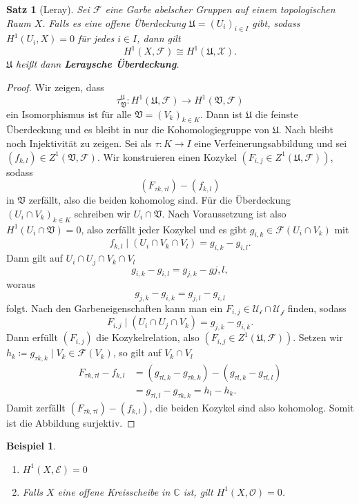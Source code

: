 \documentclass[11pt,a4paper,toc=bibliography]{scrartcl}
\theoremstyle{thm}
\newtheorem{satz}{Satz}[section]
\theoremstyle{def}
\newtheorem{bsp}{Beispiel}[section]
\theoremstyle{remark}
\begin{document}
\begin{satz}[Leray]
Sei $\mathcal{F}$ eine Garbe abelscher Gruppen auf einem topologischen Raum $X$. Falls es eine offene Überdeckung $\mathfrak{U}=(U_i)_{i\in I}$ gibt, sodass $H^1(U_i,X)=0$ für jedes $i\in I$, dann gilt
\[
H^1(X,\mathcal{F})\cong H^1(\mathfrak{U},\mathcal{X}).
\]
$\mathfrak{U}$ heißt dann \textbf{Leraysche Überdeckung}.
\end{satz}
\begin{proof}
	Wir zeigen, dass
	\[\tau_{\mathfrak{V}}^{\mathfrak{U}}:H^1(\mathfrak{U},\mathcal{F})\rightarrow H^1(\mathfrak{V},\mathcal{F})\]
	ein Isomorphismus ist für alle $\mathfrak{V}=(V_k)_{k\in K}$. Dann ist $\mathfrak{U}$ die feinste Überdeckung und es bleibt in  nur die Kohomologiegruppe von $\mathfrak{U}$. Nach  bleibt noch Injektivität zu zeigen.
	Sei als $\tau : K\rightarrow I$ eine Verfeinerungsabbildung und sei $(f_{k,l})\in Z^1(\mathfrak{V},\mathcal{F}).$ Wir konstruieren einen Kozykel $(F_{i,j}\in Z^1(\mathfrak{U},\mathcal{F}))$, sodass \[(F_{\tau k,\tau l})-(f_{k,l})\]
	in $\mathfrak{V}$ zerfällt, also die beiden kohomolog sind.
	Für die Überdeckung $(U_i\cap V_k)_{k\in K}$ schreiben wir $U_i\cap\mathfrak{V}$. Nach Voraussetzung ist also $H^1(U_i\cap \mathfrak{V})=0$, also zerfällt jeder Kozykel und es gibt $g_{i,k}\in\mathcal{F}(U_i\cap V_k)$ mit
	\[f_{k,l}\mid (U_i\cap V_k\cap V_l)=g_{i,k}-g_{i,l}.
	\]
	Dann gilt auf $U_i\cap U_j\cap V_k\cap V_l$
	\[g_{i,k}-g_{i,l}=g_{j,k}-g{j,l},
	\]
	woraus
	\[g_{j,k}-g_{i,k}=g_{j,l}-g_{i,l}
	\]
	folgt. Nach den Garbeneigenschaften kann man ein $F_{i,j}\in\mathcal{U_i\cap U_j}$ finden, sodass
	\[F_{i,j}\mid(U_i\cap U_j\cap V_k)= g_{j,k}-g_{i,k}.
	\]
	Dann erfüllt $(F_{i,j})$ die Kozykelrelation, also $(F_{i,j}\in Z^1(\mathfrak{U},\mathcal{F}))$.
	Setzen wir $h_{k}\coloneqq g_{\tau k, k}\mid V_k \in \mathcal{F}(V_k)$, so gilt auf $V_k\cap V_l$
	\begin{align*}
		F_{\tau k,\tau l} -f_{k,l}&=(g_{\tau l,k}-g_{\tau k,k})-(g_{\tau l,k}-g_{\tau l,l})\\
		&=g_{\tau l,l}-g_{\tau k, k}=h_l-h_k.
	\end{align*}
	Damit zerfällt $(F_{\tau k,\tau l})-(f_{k,l})$, die beiden Kozykel sind also kohomolog. Somit ist die Abbildung surjektiv.
\end{proof}

\begin{bsp}
\begin{enumerate}
    \item
    $H^1(X,\mathcal{E})=0$ \cite[~S.92,12.6]{forster}
    \item
    Falls $X$ eine offene Kreisscheibe in $\mathbb{C}$ ist, gilt $H^1(X,\mathcal{O})=0$. \cite[S.98,13.4]{forster}
\end{enumerate}
\end{bsp}
\end{document}
